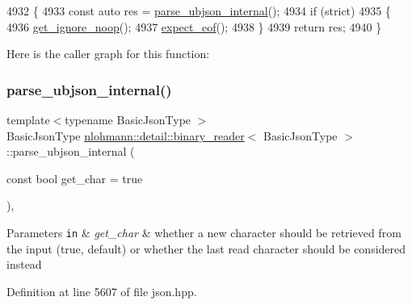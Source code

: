 \begin{DoxyCode}
4932     \{
4933         \textcolor{keyword}{const} \textcolor{keyword}{auto} res = \hyperlink{classnlohmann_1_1detail_1_1binary__reader_a439e369278be4412b05f3481c226eafa}{parse\_ubjson\_internal}();
4934         \textcolor{keywordflow}{if} (strict)
4935         \{
4936             \hyperlink{classnlohmann_1_1detail_1_1binary__reader_a372a4b61f0c57f3d4f1e9484a416a3cd}{get\_ignore\_noop}();
4937             \hyperlink{classnlohmann_1_1detail_1_1binary__reader_ad0eebfcfd82778a76e1ae72dec49c25f}{expect\_eof}();
4938         \}
4939         \textcolor{keywordflow}{return} res;
4940     \}
\end{DoxyCode}
Here is the caller graph for this function\+:
\mbox{\label{classnlohmann_1_1detail_1_1binary__reader_a439e369278be4412b05f3481c226eafa}} 
\subsubsection{\texorpdfstring{parse\+\_\+ubjson\+\_\+internal()}{parse\_ubjson\_internal()}}
{\footnotesize\ttfamily template$<$typename Basic\+Json\+Type $>$ \\
Basic\+Json\+Type \hyperlink{classnlohmann_1_1detail_1_1binary__reader}{nlohmann\+::detail\+::binary\+\_\+reader}$<$ Basic\+Json\+Type $>$\+::parse\+\_\+ubjson\+\_\+internal (\begin{DoxyParamCaption}\item[{const bool}]{get\+\_\+char = {\ttfamily true} }\end{DoxyParamCaption})\hspace{0.3cm}{\ttfamily [inline]}, {\ttfamily [private]}}


\begin{DoxyParams}[1]{Parameters}
\mbox{\tt in}  & {\em get\+\_\+char} & whether a new character should be retrieved from the input (true, default) or whether the last read character should be considered instead \\
\hline
\end{DoxyParams}


Definition at line 5607 of file json.\+hpp.


